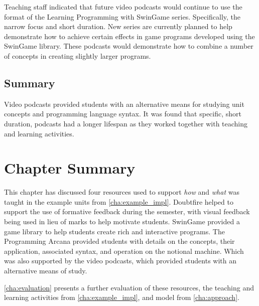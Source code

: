 Teaching staff indicated that future video podcasts would continue to use the format of the Learning Programming with SwinGame series. Specifically, the narrow focus and short duration. New series are currently planned to help demonstrate how to achieve certain effects in game programs developed using the SwinGame library. These podcasts would demonstrate how to combine a number of concepts in creating slightly larger programs.


\subsection{Summary} %
\label{sub:vodcast_summary}

Video podcasts provided students with an alternative means for studying unit concepts and programming language syntax. It was found that specific, short duration, podcasts had a longer lifespan as they worked together with teaching and learning activities.








\section{Chapter Summary} %
\label{sec:supporting_summary}

This chapter has discussed four resources used to support \emph{how} and \emph{what} was taught in the example units from \cref{cha:example_impl}. Doubtfire helped to support the use of formative feedback during the semester, with visual feedback being used in lieu of marks to help motivate students. SwinGame provided a game library to help students create rich and interactive programs. The Programming Arcana provided students with details on the concepts, their application, associated syntax, and operation on the notional machine. Which was also supported by the video podcasts, which provided students with an alternative means of study.

\cref{cha:evaluation} presents a further evaluation of these resources, the teaching and learning activities from \cref{cha:example_impl}, and model from \cref{cha:approach}.



